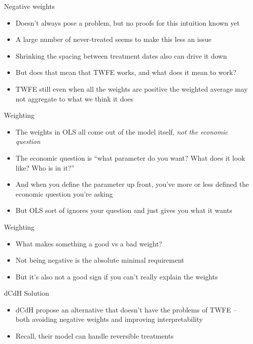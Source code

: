 \documentclass{beamer}
\begin{document}
\begin{frame}{Negative weights}

\begin{itemize}
\item Doesn't always pose a problem, but no proofs for this intuition known yet
\item A large number of never-treated seems to make this less an issue
\item Shrinking the spacing between treatment dates also can drive it down
\item But does that mean that TWFE works, and what does it mean to work?
\item TWFE still even when all the weights are positive the weighted average may not aggregate to what we think it does
\end{itemize}

\end{frame}

\begin{frame}{Weighting}

\begin{itemize}
\item The weights in OLS all come out of the model itself, \emph{not the economic question}
\item The economic question is ``what parameter do you want? What does it look like? Who is in it?''
\item And when you define the parameter up front, you've more or less defined the economic question you're asking
\item But OLS sort of ignores your question and just gives you what it wants
\end{itemize}

\end{frame}

\begin{frame}{Weighting}

\begin{itemize}
\item What makes something a good vs a bad weight?
\item Not being negative is the absolute minimal requirement
\item But it's also not a good sign if you can't really explain the weights
\end{itemize}

\end{frame}

\begin{frame}{dCdH Solution}

\begin{itemize}
\item dCdH propose an alternative that doesn't have the problems of TWFE -- both avoiding negative weights and improving interpretability
\item Recall, their model can handle reversible treatments

\end{itemize}

\end{frame}
\end{document}

